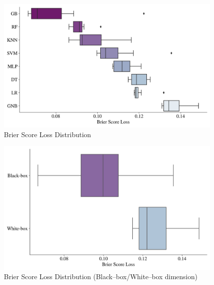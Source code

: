 \begin{figure}[H]
    \centering
    \caption{Brier Score Loss Distribution}\vspace{0.5em}
    \label{fig:bsldist}
    \includegraphics[width=140mm]{Figures/BRIER SCORE LOSS_Distribution.jpg}
    
    \vspace{-1em}
\end{figure}

\begin{figure}[H]
    \centering
    \caption{Brier Score Loss Distribution (Black--box/White--box dimension)}\vspace{0.5em}
    \label{fig:bsldistbbwb}
    \includegraphics[width=140mm]{Figures/BRIER SCORE LOSS_Distribution_BB_WB.jpg}
    
    \vspace{-1em}
\end{figure}

